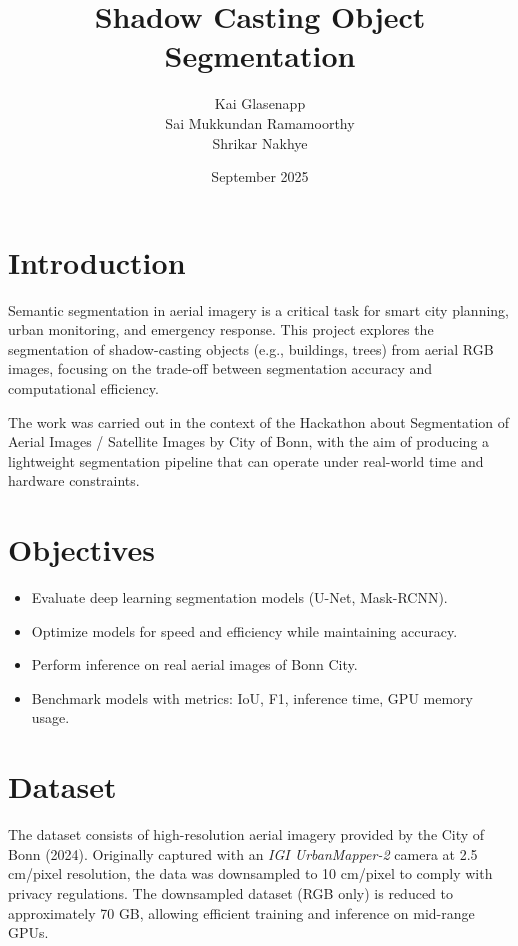 \documentclass[rnd]{mas_proposal}
\title{Shadow Casting Object Segmentation}
\author{Kai Glasenapp \\ Sai Mukkundan Ramamoorthy \\ Shrikar Nakhye}
\date{September 2025}
\begin{document}
\maketitle 
\pagestyle{plain}

\section{Introduction}

Semantic segmentation in aerial imagery is a critical task for smart city planning, 
urban monitoring, and emergency response. This project explores the segmentation 
of shadow-casting objects (e.g., buildings, trees) from aerial RGB images, focusing 
on the trade-off between segmentation accuracy and computational efficiency. 

The work was carried out in the context of the Hackathon about Segmentation of Aerial Images / Satellite Images by City of Bonn, 
with the aim of producing a lightweight segmentation pipeline that can operate under real-world time and hardware constraints. 

\section{Objectives}

\begin{itemize}
    \item Evaluate deep learning segmentation models (U-Net, Mask-RCNN).  
    \item Optimize models for speed and efficiency while maintaining accuracy.  
    \item Perform inference on real aerial images of Bonn City.  
    \item Benchmark models with metrics: IoU, F1, inference time, GPU memory usage.  
\end{itemize}

\section{Dataset}

The dataset consists of high-resolution aerial imagery provided by the City of Bonn (2024).  
Originally captured with an \textit{IGI UrbanMapper-2} camera at 2.5 cm/pixel resolution,  
the data was downsampled to 10 cm/pixel to comply with privacy regulations.  
The downsampled dataset (RGB only) is reduced to approximately 70 GB,  
allowing efficient training and inference on mid-range GPUs.  
\end{document}
